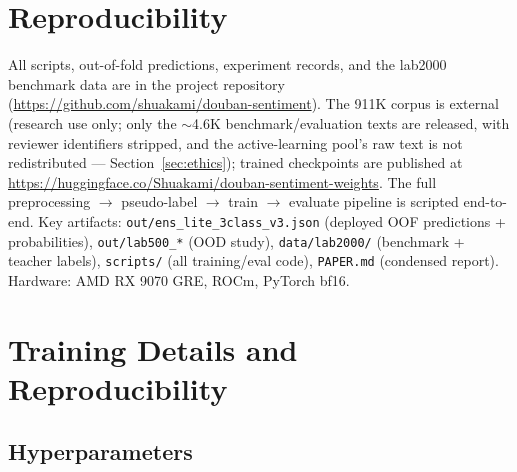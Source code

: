 \documentclass[11pt,a4paper]{article}
\newcommand{\code}[1]{\texttt{#1}}
\begin{document}
\section*{Reproducibility}

\begin{sloppypar}
All scripts, out-of-fold predictions, experiment records, and the
lab2000 benchmark data are in the
project repository (\url{https://github.com/shuakami/douban-sentiment}).
The 911K corpus is external (research use only; only the
$\sim$4.6K benchmark/evaluation texts are released, with reviewer
identifiers stripped, and the active-learning pool's raw text is not
redistributed --- Section~\ref{sec:ethics});
trained checkpoints are published at
\url{https://huggingface.co/Shuakami/douban-sentiment-weights}. The
full preprocessing $\to$ pseudo-label $\to$ train $\to$ evaluate
pipeline is scripted end-to-end.
Key artifacts: \code{out/ens\_lite\_3class\_v3.json} (deployed OOF
predictions + probabilities), \code{out/lab500\_*} (OOD study),
\code{data/lab2000/} (benchmark + teacher labels),
\code{scripts/} (all training/eval code), \code{PAPER.md} (condensed
report). Hardware: AMD RX 9070 GRE, ROCm, PyTorch bf16.
\end{sloppypar}

\appendix
\section{Training Details and Reproducibility}
\label{app:repro}

\subsection{Hyperparameters}
\end{document}
